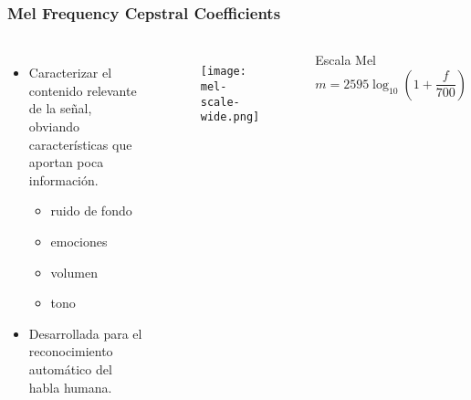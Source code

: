 \begin{frame}
    \frametitle{Mel Frequency Cepstral Coefficients}

    \begin{columns}
        \pause

        \begin{itemize}
            \item Caracterizar el contenido relevante de la señal, obviando características que aportan poca información.
            \begin{itemize}
                \item ruido de fondo
                \item emociones
                \item volumen
                \item tono
            \end{itemize}
            \item Desarrollada para el reconocimiento automático del habla humana.
        \end{itemize}

        \pause

        \begin{figure}[!h]
            \centering
            \texttt{[image: mel-scale-wide.png]}
        \end{figure}

        \begin{block}{Escala Mel}
            \begin{equation*}
                m = 2595\log_{10}\left( 1 + \frac{f}{700} \right)
            \end{equation*}
        \end{block}

    \end{columns}
\end{frame}

